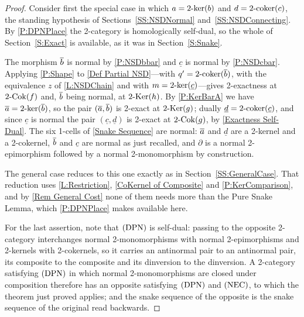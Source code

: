 \begin{proof}
  \leanok
  Consider first the special case in which \(a=2\text{-}\mathrm{ker}(b)\) and \(d=2\text{-}\mathrm{coker}(c)\), the standing hypothesis of Sections~\ref{SS:NSDNormal} and~\ref{SS:NSDConnecting}. By \prox\ref{P:DPNPlace} the 2-category is homologically self-dual, so the whole of Section~\ref{S:Exact} is available, as it was in Section~\ref{S:Snake}.

	The morphism \(\overline{b}\) is normal by \prox\ref{P:NSDbbar} and \(\underline{c}\) is normal by \prox\ref{P:NSDcbar}. Applying \prox\ref{P:Shape} to \eqref{Def Partial NSD}---with \(q'=2\text{-}\mathrm{coker}(\overline{b})\), with the equivalence \(z\) of \lemx\ref{L:NSDChain} and with \(m=2\text{-}\mathrm{ker}(\underline{c})\)---gives 2-exactness at \(2\text{-}\mathrm{Cok}(f)\) and, \(\overline{b}\) being normal, at \(2\text{-}\mathrm{Ker}(h)\). By \prox\ref{P:KerBarA} we have \(\overline{a}=2\text{-}\mathrm{ker}(\overline{b})\), so the pair \((\overline{a},\overline{b})\) is 2-exact at \(2\text{-}\mathrm{Ker}(g)\); dually \(\underline{d}=2\text{-}\mathrm{coker}(\underline{c})\), and since \(\underline{c}\) is normal the pair \((\underline{c},\underline{d})\) is 2-exact at \(2\text{-}\mathrm{Cok}(g)\), by \prox\ref{Exactness Self-Dual}. The six 1-cells of \eqref{Snake Sequence} are normal: \(\overline{a}\) and \(\underline{d}\) are a 2-kernel and a 2-cokernel, \(\overline{b}\) and \(\underline{c}\) are normal as just recalled, and \(\partial\) is a normal 2-epimorphism followed by a normal 2-monomorphism by construction.

	The general case reduces to this one exactly as in Section~\ref{SS:GeneralCase}. That reduction uses \lemx\ref{L:Restriction}, \prox\ref{CoKernel of Composite} and \prox\ref{P:KerComparison}, and by \remx\ref{Rem General Cost} none of them needs more than the Pure Snake Lemma, which \prox\ref{P:DPNPlace} makes available here.

	For the last assertion, note that \(\textup{(DPN)}\) is self-dual: passing to the opposite 2-category interchanges normal 2-monomorphisms with normal 2-epimorphisms and 2-kernels with 2-cokernels, so it carries an antinormal pair to an antinormal pair, its composite to the composite and its dinversion to the dinversion. A 2-category satisfying \(\textup{(DPN)}\) in which normal 2-monomorphisms are closed under composition therefore has an opposite satisfying \(\textup{(DPN)}\) and \(\textup{(NEC)}\), to which the theorem just proved applies; and the snake sequence of the opposite is the snake sequence of the original read backwards.
\end{proof}


